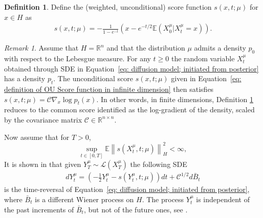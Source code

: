 \documentclass[10pt]{article} %
\def\Eqref#1{Equation~\ref{#1}}
\newcommand{\E}{\mathbb{E}}
\newcommand{\R}{\mathbb{R}}
\theoremstyle{plain}
\theoremstyle{definition}
\newtheorem{definition}[theorem]{Definition}
\theoremstyle{remark}
\newtheorem{remark}[theorem]{Remark}
\renewcommand{\L}{\mathscr{L}}
\newcommand{\norm}[1]{\left\|#1\right\|}
\newcommand{\C}{\mathcal C}
\begin{document}
\begin{definition}\label{def: definition of OU Score function in infinite dimension}
    Define the (weighted, unconditional) score function $s(x,t; \mu)$ for $x \in H$ as
    \begin{eqnarray}\label{eq: definition of OU Score function in infinite dimension}
       s(x, t; \mu) = -\frac{1}{1-e^{-t}}\left(x - e^{-t/2}\E(X^{\mu}_0 |X^{\mu}_t = x)\right).
    \end{eqnarray}
\end{definition}

\begin{remark}
    Assume that $H = \R^n$ and that the distribution $\mu$ admits a density $p_0$ with respect to the Lebesgue measure.  For any $t \ge 0$ the random variable $X^{\mu}_t$ obtained through SDE in \Eqref{eq: diffusion model; initiated from posterior} has a density $p_t$. The unconditional score $s(x,t; \mu)$ given in \Eqref{eq: definition of OU Score function in infinite dimension} then satisfies $s(x, t; \mu) = \C \nabla_x \log p_t(x)$.
    In other words, in finite dimensions, Definition \ref{def: definition of OU Score function in infinite dimension} reduces to the common score identified as the log-gradient of the density, scaled by the covariance matrix $\C \in \R^{n\times n}$.
\end{remark}
Now assume that for $T> 0$, 
\begin{equation} \label{eq:expected_square_norm_of_score_is_finite}
    \sup_{t \in [0, T]} \E \norm{s(X_t^\mu, t; \mu)}_H^2 < \infty,
\end{equation}
It is shown in \citet{pidstrigach2023infinitedimensional} that   
given $Y_T^{\mu} \sim \L(X_T^{\mu})$ the following SDE
    \begin{eqnarray}\label{eq: BSDE infdim}
    dY^{\mu}_t = \left(-\frac{1}{2} Y^{\mu}_t- s(Y^{\mu}_t, t; \mu)\right) dt + \C^{1/2} d\bar B_t
\end{eqnarray}
is the time-reversal of \Eqref{eq: diffusion model; initiated from posterior},
where $\bar B_t$ is a different Wiener process on $H$.
The process $Y^{\mu}_t$ is independent of the past increments of $\bar B_t$, but not of the future ones, see \citet{ANDERSON1982-BSDE}.
\end{document}
